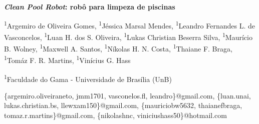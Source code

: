 \begin{report-title}
\textbf{\textit{Clean Pool Robot}: robô para limpeza de piscinas}
\end{report-title}

\begin{author-list}
\textsuperscript{1}Argemiro de Oliveira Gomes,
\textsuperscript{1}Jéssica Marsal Mendes,
\textsuperscript{1}Leandro Fernandes L. de Vasconcelos,
\textsuperscript{1}Luan H. dos S. Oliveira,
\textsuperscript{1}Lukas Christian Beserra Silva,
\textsuperscript{1}Maurício B. Wolney,
\textsuperscript{1}Maxwell A. Santos,
\textsuperscript{1}Níkolas H. N. Costa,
\textsuperscript{1}Thaiane F. Braga,
\textsuperscript{1}Tomáz F. R. Martins,
\textsuperscript{1}Vinícius G. Hass
\end{author-list}

\begin{author-address}
\textsuperscript{1}Faculdade do Gama - Universidade de Brasília (UnB)
\end{author-address}

\begin{e-mails}
\{argemiro.oliveiraneto, jmm1701, vasconelos.fl, leandro\}@gmail.com,
\{luan.unai, lukas.christian.bs, llewxam150\}@gmail.com,
\{mauriciobw5632, thaianefbraga, tomaz.r.martins\}@gmail.com,
\{nikolashnc, viniciushass50\}@hotmail.com
\end{e-mails}
